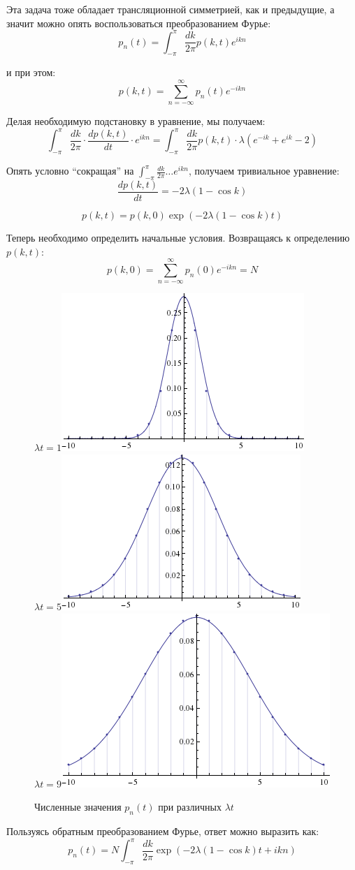 \documentclass[a4paper,12pt]{article}
\begin{document}
\noindent
Эта задача тоже обладает трансляционной симметрией, как и предыдущие,
а значит можно опять воспользоваться преобразованием Фурье:
\[
p_{n}(t)=\int_{-\pi}^{\pi}\frac{dk}{2\pi}p(k,t)e^{ikn}
\]


\noindent
и при этом:
\[
p(k,t)=\sum_{n=-\infty}^{\infty}p_{n}(t)e^{-ikn}
\]


\noindent
Делая необходимую подстановку в уравнение, мы получаем:
\[
\int_{-\pi}^{\pi}\frac{dk}{2\pi}\cdot\frac{dp(k,t)}{dt}\cdot e^{ikn}=\int_{-\pi}^{\pi}\frac{dk}{2\pi}p(k,t)\cdot\lambda(e^{-ik}+e^{ik}-2)
\]


\noindent
Опять условно ``сокращая'' на $\int_{-\pi}^{\pi}\frac{dk}{2\pi}\dots e^{ikn}$,
получаем тривиальное уравнение:
\[
\frac{dp\left(k,t\right)}{dt}=-2\lambda(1-\cos k)
\]


\[
p\left(k,t\right)=p\left(k,0\right)\exp(-2\lambda(1-\cos k)t)
\]


\noindent
Теперь необходимо определить начальные условия. Возвращаясь к определению
$p(k,t)$:
\[
p(k,0)=\sum_{n=-\infty}^{\infty}p_{n}(0)e^{-ikn}=N
\]


\begin{figure}[h]
\caption{Численные значения $p_{n}\left(t\right)$ при различных $\lambda t$}
\centering
$\lambda t=1${\includegraphics[width=0.3\columnwidth]{diffusion1.png}}
$\lambda t=5${\includegraphics[width=0.3\columnwidth]{diffusion2.png}}
$\lambda t=9${\includegraphics[width=0.3\columnwidth]{diffusion3.png}}
\end{figure}


\noindent
Пользуясь обратным преобразованием Фурье, ответ можно выразить как:
\[
p_{n}(t)=N\int_{-\pi}^{\pi}\frac{dk}{2\pi}\exp(-2\lambda(1-\cos k)t+ikn)
\]
\end{document}
